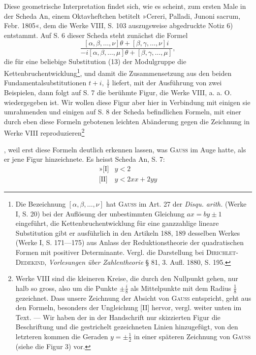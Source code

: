 Diese geometrische Interpretation findet sich, wie es scheint, zum ersten
Male in der Scheda An, einem Oktavheftchen betitelt »Cereri, Palladi, Junoni
sacrum, Febr. 1805«, dem die Werke VIII, S. 103 auszugsweise abgedruckte
Notiz 6) entstammt. Auf S. 6 dieser Scheda steht zunächst die Formel
\[
\frac{[\alpha,\beta,\ldots,\nu]\theta+[\beta,\gamma,\ldots,\nu]i}
{-i[\alpha,\beta,\ldots,\mu]\theta+[\beta,\gamma,\ldots,\mu]},
\]
\clearpage{}
\noindent die für eine beliebige Substitution (13) der Modulgruppe die Kettenbruchentwicklung\footnote{Die Bezeichnung \([\alpha,\beta,\ldots,\nu]\) hat \textsc{Gauss} im Art. 27 der \textit{Disqu. arith.} (Werke I, S. 20) bei der Auflösung der unbestimmten Gleichung \(ax=by\pm1\) eingeführt, die Kettenbruchentwicklung für eine ganzzahlige lineare Substitution gibt er ausführlich in den Artikeln 188, 189 desselben Werkes (Werke I, S. 171—175) aus Anlass der Reduktionstheorie der quadratischen Formen mit positiver Determinante. Vergl. die Darstellung bei \textsc{Dirichlet-Dedekind}, \textit{Vorlesungen über Zahlentheorie} § 81, 3. Aufl. 1880, S. 195.}, und damit die Zusammensetzung aus den beiden Fundamentalsubstitutionen
\(t+i,\ \frac1t\) liefert, mit der Ausführung von zwei Beispielen, dann
folgt auf S. 7 die berühmte Figur, die Werke VIII, a. a. O. wiedergegeben
ist. Wir wollen diese Figur aber hier in Verbindung mit einigen sie umrahmenden
und einigen auf S. 8 der Scheda befindlichen Formeln, mit einer
durch eben diese Formeln gebotenen leichten Abänderung gegen die Zeichnung
in Werke VIII reproduzieren\begingroup\renewcommand{\thefootnote}{140a)}\footnote{Werke VIII sind die kleineren Kreise, die durch den Nullpunkt gehen, nur halb so gross, also um die Punkte \(\pm\frac i8\) als Mittelpunkte mit dem Radius \(\frac18\) gezeichnet. Dass unsere Zeichnung der Absicht von \textsc{Gauss} entspricht, geht aus den Formeln, besonders der Ungleichung [II] hervor, vergl. weiter unten im Text. — Wir haben der in der Handschrift nur skizzierten Figur die Beschriftung und die gestrichelt gezeichneten Linien hinzugefügt, von den letzteren kommen die Geraden \(y=\pm\frac12\) in einer späteren Zeichnung von \textsc{Gauss} (siehe die Figur 3) vor.}\addtocounter{footnote}{-1}\endgroup, weil erst diese Formeln deutlich erkennen
lassen, was \textsc{Gauss} im Auge hatte, als er jene Figur hinzeichnete. Es
heisst Scheda An, S. 7:
\[
\begin{array}{ll}
\text{»[I]}&y<2\\
{}\text{[II]}&y<2xx+2yy
\end{array}
\]
